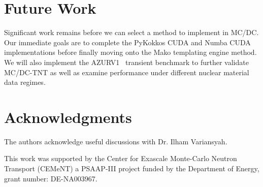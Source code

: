 \section{Future Work}

Significant work remains before we can select a method to implement in MC/DC.
Our immediate goals are to complete the PyKokkos CUDA and Numba CUDA implementations before finally moving onto the Mako templating engine method.
We will also implement the AZURV1~\cite{ganapol_homogeneous_2001} transient benchmark to further validate MC/DC-TNT as well as examine performance under different nuclear material data regimes.

\section{Acknowledgments}
The authors acknowledge useful discussions with Dr. Ilham Variansyah.

This work was supported by the Center for Exascale Monte-Carlo Neutron Transport (CEMeNT) a PSAAP-III project funded by the Department of Energy, grant number: DE-NA003967.

